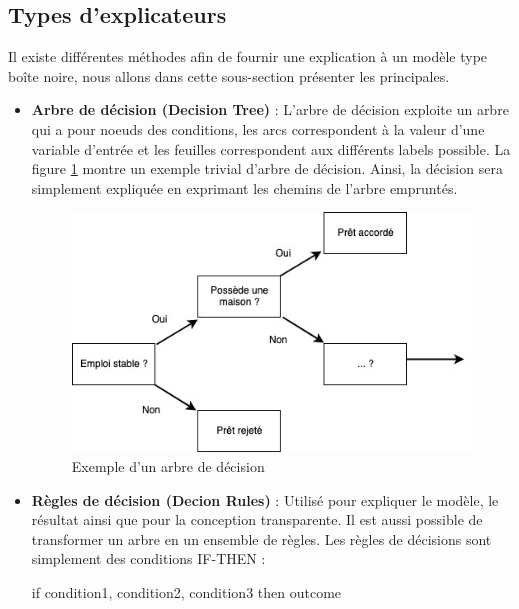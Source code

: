 \subsection{Types d'explicateurs}
Il existe différentes méthodes afin de fournir une explication à un modèle type boîte noire, nous allons dans cette sous-section présenter les principales.\par
\begin{itemize}
    \item \textbf{Arbre de décision (Decision Tree)} : L'arbre de décision exploite un arbre qui a pour noeuds des conditions, les arcs correspondent à la valeur d'une variable d'entrée et les feuilles correspondent aux différents labels possible. La figure \ref{decision_tree} montre un exemple trivial d'arbre de décision. Ainsi, la décision sera simplement expliquée en exprimant les chemins de l'arbre empruntés. 

    \begin{figure}[h]
    \centering
    \includegraphics[scale=0.5]{src_img/decision_tree.jpg}
    \caption{Exemple d'un arbre de décision}
    \label{decision_tree}
    \end{figure}
    
    \item \textbf{Règles de décision (Decion Rules)} : Utilisé pour expliquer le modèle, le résultat ainsi que pour la conception transparente. Il est aussi possible de transformer un arbre en un ensemble de règles. Les règles de décisions sont simplement des conditions IF-THEN : 
    
    if condition1, condition2, condition3 then outcome 
    

\end{itemize}
